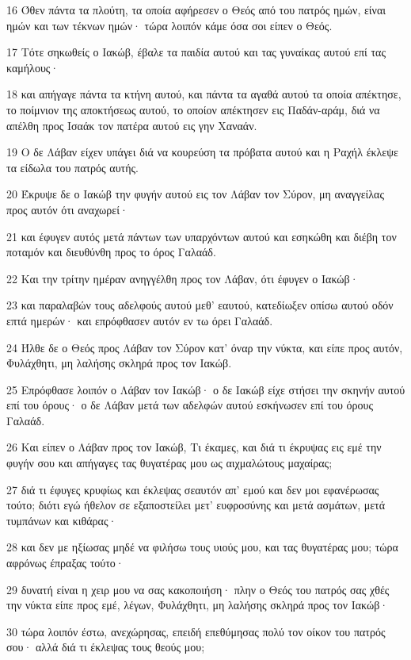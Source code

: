 \par 16 Όθεν πάντα τα πλούτη, τα οποία αφήρεσεν ο Θεός από του πατρός ημών, είναι ημών και των τέκνων ημών· τώρα λοιπόν κάμε όσα σοι είπεν ο Θεός.
\par 17 Τότε σηκωθείς ο Ιακώβ, έβαλε τα παιδία αυτού και τας γυναίκας αυτού επί τας καμήλους·
\par 18 και απήγαγε πάντα τα κτήνη αυτού, και πάντα τα αγαθά αυτού τα οποία απέκτησε, το ποίμνιον της αποκτήσεως αυτού, το οποίον απέκτησεν εις Παδάν-αράμ, διά να απέλθη προς Ισαάκ τον πατέρα αυτού εις γην Χαναάν.
\par 19 Ο δε Λάβαν είχεν υπάγει διά να κουρεύση τα πρόβατα αυτού και η Ραχήλ έκλεψε τα είδωλα του πατρός αυτής.
\par 20 Έκρυψε δε ο Ιακώβ την φυγήν αυτού εις τον Λάβαν τον Σύρον, μη αναγγείλας προς αυτόν ότι αναχωρεί·
\par 21 και έφυγεν αυτός μετά πάντων των υπαρχόντων αυτού και εσηκώθη και διέβη τον ποταμόν και διευθύνθη προς το όρος Γαλαάδ.
\par 22 Και την τρίτην ημέραν ανηγγέλθη προς τον Λάβαν, ότι έφυγεν ο Ιακώβ·
\par 23 και παραλαβών τους αδελφούς αυτού μεθ' εαυτού, κατεδίωξεν οπίσω αυτού οδόν επτά ημερών· και επρόφθασεν αυτόν εν τω όρει Γαλαάδ.
\par 24 Ήλθε δε ο Θεός προς Λάβαν τον Σύρον κατ' όναρ την νύκτα, και είπε προς αυτόν, Φυλάχθητι, μη λαλήσης σκληρά προς τον Ιακώβ.
\par 25 Επρόφθασε λοιπόν ο Λάβαν τον Ιακώβ· ο δε Ιακώβ είχε στήσει την σκηνήν αυτού επί του όρους· ο δε Λάβαν μετά των αδελφών αυτού εσκήνωσεν επί του όρους Γαλαάδ.
\par 26 Και είπεν ο Λάβαν προς τον Ιακώβ, Τι έκαμες, και διά τι έκρυψας εις εμέ την φυγήν σου και απήγαγες τας θυγατέρας μου ως αιχμαλώτους μαχαίρας;
\par 27 διά τι έφυγες κρυφίως και έκλεψας σεαυτόν απ' εμού και δεν μοι εφανέρωσας τούτο; διότι εγώ ήθελον σε εξαποστείλει μετ' ευφροσύνης και μετά ασμάτων, μετά τυμπάνων και κιθάρας·
\par 28 και δεν με ηξίωσας μηδέ να φιλήσω τους υιούς μου, και τας θυγατέρας μου; τώρα αφρόνως έπραξας τούτο·
\par 29 δυνατή είναι η χειρ μου να σας κακοποιήση· πλην ο Θεός του πατρός σας χθές την νύκτα είπε προς εμέ, λέγων, Φυλάχθητι, μη λαλήσης σκληρά προς τον Ιακώβ·
\par 30 τώρα λοιπόν έστω, ανεχώρησας, επειδή επεθύμησας πολύ τον οίκον του πατρός σου· αλλά διά τι έκλεψας τους θεούς μου;
